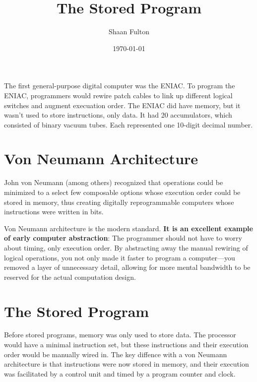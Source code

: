 \documentclass[12pt]{article}
\title{The Stored Program}
\author{Shaan Fulton}
\date{\today}
\begin{document}
\maketitle

The first general-purpose digital computer was the ENIAC. To program the ENIAC, programmers would rewire patch cables to link up different logical switches and augment execuation order. The ENIAC did have memory, but it wasn't used to store instructions, only data. It had 20 accumulators, which consisted of binary vacuum tubes. Each represented one 10-digit decimal number.

\section*{Von Neumann Architecture}

John von Neumann (among others) recognized that operations could be minimized to a select few composable options whose execution order could be stored in memory, thus creating digitally reprogrammable computers whose instructions were written in bits.

Von Neumann architecture is the modern standard. \textbf{It is an excellent example of early computer abstraction}: The programmer should not have to worry about timing, only execution order. By abstracting away the manual rewiring of logical operations, you not only made it faster to program a computer—you removed a layer of unnecessary detail, allowing for more mental bandwidth to be reserved for the actual computation design.

\section*{The Stored Program}

Before stored programs, memory was only used to store data. The processor would have a minimal instruction set, but these instructions and their execution order would be manually wired in. The key diffence with a von Neumann architecture is that instructions were now stored in memory, and their execution was facilitated by a control unit and timed by a program counter and clock.
\end{document}
